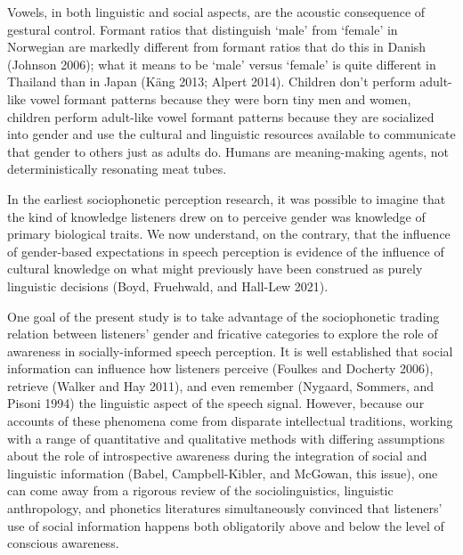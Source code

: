 \documentclass[
  letterpaper,
  DIV=11,
  numbers=noendperiod]{scrartcl}
\begin{document}
Vowels, in both linguistic and social aspects, are the acoustic
consequence of gestural control. Formant ratios that distinguish `male'
from `female' in Norwegian are markedly different from formant ratios
that do this in Danish (Johnson 2006); what it means to be `male' versus
`female' is quite different in Thailand than in Japan (Käng 2013; Alpert
2014). Children don't perform adult-like vowel formant patterns because
they were born tiny men and women, children perform adult-like vowel
formant patterns because they are socialized into gender and use the
cultural and linguistic resources available to communicate that gender
to others just as adults do. Humans are meaning-making agents, not
deterministically resonating meat tubes.

In the earliest sociophonetic perception research, it was possible to
imagine that the kind of knowledge listeners drew on to perceive gender
was knowledge of primary biological traits. We now understand, on the
contrary, that the influence of gender-based expectations in speech
perception is evidence of the influence of cultural knowledge on what
might previously have been construed as purely linguistic decisions
(Boyd, Fruehwald, and Hall-Lew 2021).

One goal of the present study is to take advantage of the sociophonetic
trading relation between listeners' gender and fricative categories to
explore the role of awareness in socially-informed speech perception. It
is well established that social information can influence how listeners
perceive (Foulkes and Docherty 2006), retrieve (Walker and Hay 2011),
and even remember (Nygaard, Sommers, and Pisoni 1994) the linguistic
aspect of the speech signal. However, because our accounts of these
phenomena come from disparate intellectual traditions, working with a
range of quantitative and qualitative methods with differing assumptions
about the role of introspective awareness during the integration of
social and linguistic information (Babel, Campbell-Kibler, and McGowan,
this issue), one can come away from a rigorous review of the
sociolinguistics, linguistic anthropology, and phonetics literatures
simultaneously convinced that listeners' use of social information
happens both obligatorily above and below the level of conscious
awareness.
\end{document}
